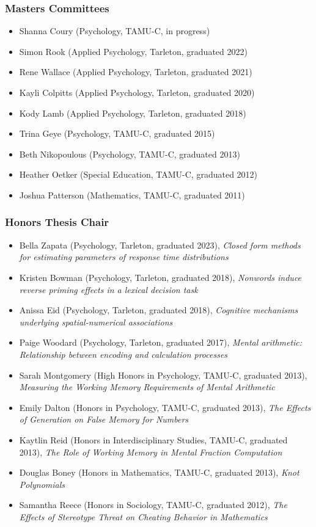 \documentclass[article,10pt]{article}
\begin{document}
\subsubsection*{Masters Committees}
\label{sec:org0c4cf70}
\begin{itemize}
\item Shanna Coury (Psychology, TAMU-C, in progress)
\item Simon Rook (Applied Psychology, Tarleton, graduated 2022)
\item Rene Wallace (Applied Psychology, Tarleton, graduated 2021)
\item Kayli Colpitts (Applied Psychology, Tarleton, graduated 2020)
\item Kody Lamb (Applied Psychology, Tarleton, graduated 2018)
\item Trina Geye (Psychology, TAMU-C, graduated 2015)
\item Beth Nikopoulous (Psychology, TAMU-C, graduated 2013)
\item Heather Oetker (Special Education, TAMU-C, graduated 2012)
\item Joshua Patterson (Mathematics, TAMU-C, graduated 2011)
\end{itemize}

\subsubsection*{Honors Thesis Chair}
\label{sec:org2b85d42}
\begin{itemize}
\item Bella Zapata (Psychology, Tarleton, graduated 2023), \emph{Closed form methods for estimating parameters of response time distributions}
\item Kristen Bowman (Psychology, Tarleton, graduated 2018), \emph{Nonwords induce reverse priming effects in a lexical decision task}
\item Anissa Eid (Psychology, Tarleton, graduated 2018), \emph{Cognitive mechanisms underlying spatial-numerical associations}
\item Paige Woodard (Psychology, Tarleton, graduated 2017), \emph{Mental arithmetic: Relationship between encoding and calculation processes}
\item Sarah Montgomery (High Honors in Psychology, TAMU-C, graduated 2013), \emph{Measuring the Working Memory Requirements of Mental Arithmetic}
\item Emily Dalton (Honors in Psychology, TAMU-C, graduated 2013), \emph{The Effects of Generation on False Memory for Numbers}
\item Kaytlin Reid (Honors in Interdisciplinary Studies, TAMU-C, graduated 2013), \emph{The Role of Working Memory in Mental Fraction Computation}
\item Douglas Boney (Honors in Mathematics, TAMU-C, graduated 2013), \emph{Knot Polynomials}
\item Samantha Reece (Honors in Sociology, TAMU-C, graduated 2012), \emph{The Effects of Stereotype Threat on Cheating Behavior in Mathematics}
\end{itemize}
\end{document}
